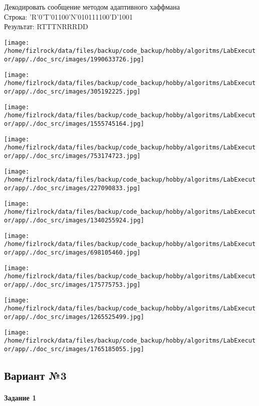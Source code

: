 \documentclass[a4paper, 12pt]{article}
\begin{document}
Декодировать сообщение методом адаптивного хаффмана \\
Строка: 
'R'0'T'01100'N'010111100'D'1001\\
Результат: RTTTNRRRDD

\texttt{[image: /home/fizlrock/data/files/backup/code\_backup/hobby/algoritms/LabExecutor/app/./doc\_src/images/1990633726.jpg]}

\texttt{[image: /home/fizlrock/data/files/backup/code\_backup/hobby/algoritms/LabExecutor/app/./doc\_src/images/305192225.jpg]}

\texttt{[image: /home/fizlrock/data/files/backup/code\_backup/hobby/algoritms/LabExecutor/app/./doc\_src/images/1555745164.jpg]}

\texttt{[image: /home/fizlrock/data/files/backup/code\_backup/hobby/algoritms/LabExecutor/app/./doc\_src/images/753174723.jpg]}

\texttt{[image: /home/fizlrock/data/files/backup/code\_backup/hobby/algoritms/LabExecutor/app/./doc\_src/images/227090833.jpg]}

\texttt{[image: /home/fizlrock/data/files/backup/code\_backup/hobby/algoritms/LabExecutor/app/./doc\_src/images/1340255924.jpg]}

\texttt{[image: /home/fizlrock/data/files/backup/code\_backup/hobby/algoritms/LabExecutor/app/./doc\_src/images/698105460.jpg]}

\texttt{[image: /home/fizlrock/data/files/backup/code\_backup/hobby/algoritms/LabExecutor/app/./doc\_src/images/175775753.jpg]}

\texttt{[image: /home/fizlrock/data/files/backup/code\_backup/hobby/algoritms/LabExecutor/app/./doc\_src/images/1265525499.jpg]}

\texttt{[image: /home/fizlrock/data/files/backup/code\_backup/hobby/algoritms/LabExecutor/app/./doc\_src/images/1765185055.jpg]}
\pagebreak
\subsection{Вариант №3}
\paragraph{Задание 1}
\end{document}
